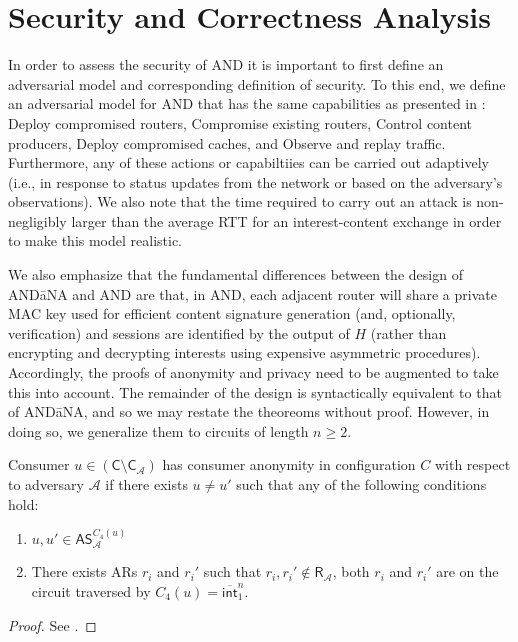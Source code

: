 \section{Security and Correctness Analysis} \label{sec:security}
In order to assess the security of {\sf AND} it is important to first define an adversarial model and corresponding definition of security. To this end, we define an adversarial model for {\sf AND} that has the same capabilities as presented in \cite{andana}: Deploy compromised routers, Compromise existing routers, Control content producers, Deploy compromised caches, and Observe and replay traffic. Furthermore, any of these actions or capabiltiies can be carried out adaptively (i.e., in response to status updates from the network or based on the adversary's observations). We also note that the time required to carry out an attack is non-negligibly larger than the average RTT for an interest-content exchange in order to make this model realistic. 

We also emphasize that the fundamental differences between the design of {\sf AND\=aNA} and {\sf AND} are that, in {\sf AND}, each adjacent router will share a private MAC key used for efficient content signature generation (and, optionally, verification) and sessions are identified by the output of $H$ (rather than encrypting and decrypting interests using expensive asymmetric procedures). Accordingly, the proofs of anonymity and privacy need to be augmented to take this into account. The remainder of the design is syntactically equivalent to that of {\sf AND\=aNA}, and so we may restate the theoreoms without proof. However, in doing so, we generalize them to circuits of length $n \geq 2$. 

\begin{thm}
Consumer $u \in (\mathsf{C} \setminus \mathsf{C}_{\mathcal{A}})$ has consumer anonymity in configuration $C$ with respect to adversary $\mathcal{A}$ if there exists $u \not= u'$ such that any of the following conditions hold:
\begin{enumerate}
	\item $u, u' \in \mathsf{AS}_{\mathcal{A}}^{C_4(u)}$
	\item There exists ARs $r_i$ and $r_i'$ such that $r_i,r_i' \notin \mathsf{R}_{\mathcal{A}}$, both $r_i$ and $r_i'$ are on the circuit traversed by $C_4(u) = \overline{\mathsf{int}}_1^n$.
\end{enumerate}
\end{thm}
\begin{proof}
See \cite{andana}.
\end{proof}

